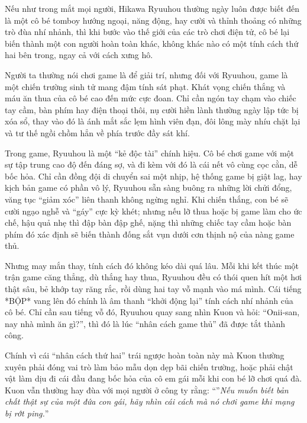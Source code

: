 \documentclass[../main.tex]{subfiles}
\begin{document}
\chrint

Nếu như trong mắt mọi người, Hikawa Ryuuhou thường ngày luôn được biết đến là một cô bé tomboy hướng ngoại, năng động, hay cười và thỉnh thoảng có những trò đùa nhí nhảnh, thì khi bước vào thế giới của các trò chơi điện tử, cô bé lại biến thành một con người hoàn toàn khác, không khác nào có một tính cách thứ hai bên trong, ngay cả với cách xưng hô.

Người ta thường nói chơi game là để giải trí, nhưng đối với Ryuuhou, game là một chiến trường sinh tử mang đậm tính sát phạt. Khát vọng chiến thắng và máu ăn thua của cô bé cao đến mức cực đoan. Chỉ cần ngón tay chạm vào chiếc tay cầm, bàn phím hay điện thoại thôi, nụ cười hiền lành thường ngày lập tức bị xóa sổ, thay vào đó là ánh mắt sắc lẹm hình viên đạn, đôi lông mày nhíu chặt lại và tư thế ngồi chồm hẳn về phía trước đầy sát khí.

Trong game, Ryuuhou là một ``kẻ độc tài'' chính hiệu. Cô bé chơi game với một sự tập trung cao độ đến đáng sợ, và đi kèm với đó là cái nết vô cùng cọc cằn, dễ bốc hỏa. Chỉ cần đồng đội di chuyển sai một nhịp, hệ thống game bị giật lag, hay kịch bản game có phần vô lý, Ryuuhou sẵn sàng buông ra những lời chửi đổng, văng tục ``giảm xóc'' liên thanh không ngừng nghỉ. Khi chiến thắng, con bé sẽ cười ngạo nghễ và ``gáy'' cực kỳ khét; nhưng nếu lỡ thua hoặc bị game làm cho ức chế, hậu quả nhẹ thì đập bàn đập ghế, nặng thì những chiếc tay cầm hoặc bàn phím đó xác định sẽ biến thành đống sắt vụn dưới cơn thịnh nộ của nàng game thủ.

Nhưng may mắn thay, tính cách đó không kéo dài quá lâu. Mỗi khi kết thúc một trận game căng thẳng, dù thắng hay thua, Ryuuhou đều có thói quen hít một hơi thật sâu, bẻ khớp tay răng rắc, rồi dùng hai tay vỗ mạnh vào má mình. Cái tiếng *BỘP* vang lên đó chính là âm thanh ``khởi động lại'' tính cách nhí nhảnh của cô bé. Chỉ cần sau tiếng vỗ đó, Ryuuhou quay sang nhìn Kuon và hỏi: ``Onii-san, nay nhà mình ăn gì?'', thì đó là lúc ``nhân cách game thủ'' đã được tắt thành công.

Chính vì cái ``nhân cách thứ hai'' trái ngược hoàn toàn này mà Kuon thường xuyên phải đóng vai trò làm bảo mẫu dọn dẹp bãi chiến trường, hoặc phải chật vật làm dịu đi cái đầu đang bốc hỏa của cô em gái mỗi khi con bé lỡ chơi quá đà. Kuon vẫn thường hay đùa với mọi người ở công ty rằng: ``''\textit{Nếu muốn biết bản chất thật sự của một đứa con gái, hãy nhìn cái cách mà nó chơi game khi mạng bị rớt ping.}''

\chrint
\end{document}

